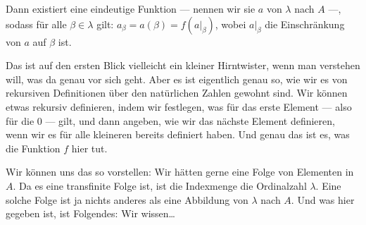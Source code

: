 \begin{spoken-clean}[00:31:41 - 00:34:20]
Dann existiert eine eindeutige Funktion --- nennen wir sie $a$ von $\lambda$ nach $A$ ---, sodass für alle $\beta \in \lambda$ gilt: $a_\beta = a(\beta) = f(a|_{\beta})$, wobei $a|_{\beta}$ die Einschränkung von $a$ auf $\beta$ ist.

Das ist auf den ersten Blick vielleicht ein kleiner Hirntwister, wenn man verstehen will, was da genau vor sich geht. Aber es ist eigentlich genau so, wie wir es von rekursiven Definitionen über den natürlichen Zahlen gewohnt sind. Wir können etwas rekursiv definieren, indem wir festlegen, was für das erste Element --- also für die $0$ --- gilt, und dann angeben, wie wir das nächste Element definieren, wenn wir es für alle kleineren bereits definiert haben. Und genau das ist es, was die Funktion $f$ hier tut.

Wir können uns das so vorstellen: Wir hätten gerne eine Folge von Elementen in $A$. Da es eine transfinite Folge ist, ist die Indexmenge die Ordinalzahl $\lambda$. Eine solche Folge ist ja nichts anderes als eine Abbildung von $\lambda$ nach $A$. Und was hier gegeben ist, ist Folgendes: Wir wissen\dots
\end{spoken-clean}

\begin{math-stroke}
\end{math-stroke}

